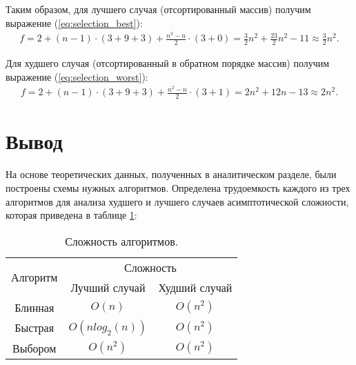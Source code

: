 Таким образом, для лучшего случая (отсортированный массив) получим выражение (\ref{eq:selection_best}):
\begin{equation} \label{eq:selection_best}
	\begin{array}{ll}
		f = 2 + (n-1)\cdot(3+9+3) + \displaystyle\frac{n^2-n}{2} \cdot(3+0) = \frac{3}{2} n^2 + \frac{23}{2}n^2 - 11 \approx \frac{3}{2}n^2.
	\end{array}
\end{equation}

Для худшего случая (отсортированный в обратном порядке массив) получим выражение (\ref{eq:selection_worst}):
\begin{equation} \label{eq:selection_worst}
	\begin{array}{ll}
		f = 2 + (n - 1)\cdot(3 + 9 + 3) + \displaystyle\frac{n^2 - n}{2} \cdot(3 + 1) = 2n^2 + 12n - 13 \approx 2n^2.
	\end{array}
\end{equation}

\section*{Вывод}
На основе теоретических данных, полученных в аналитическом разделе, были построены схемы нужных алгоритмов. Определена трудоемкость каждого из трех алгоритмов для анализа худшего и лучшего случаев асимптотической сложности, которая приведена в таблице \ref{table:ref1}:
\begin{table}[ht!]
	\centering
	\captionsetup{singlelinecheck = false, justification=raggedleft}
	\caption{Сложность алгоритмов.}
	\label{table:ref1}
	\begin{tabular}{|c|c|c|}
		\hline
		\multirow{2}{*}{Алгоритм}& \multicolumn{2}{c|}{Сложность} \\ \cline{2-3} 
		& Лучший случай & Худший случай \\
		\hline
		Блинная & $O(n)$  & $O(n^2)$ \\
		\hline
		Быстрая & $O(nlog_{2}(n))$  & $O(n^2)$ \\
		\hline
		Выбором & $O(n^2)$  & $O(n^2)$ \\
		\hline
	\end{tabular}
\end{table}